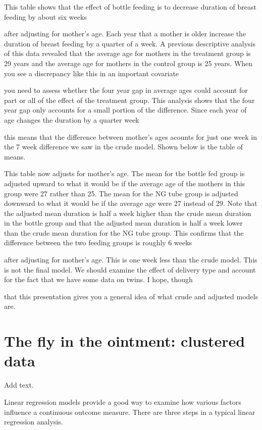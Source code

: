 \documentclass[
  letterpaper,
  DIV=11,
  numbers=noendperiod]{scrreprt}
\begin{document}
This table shows that the effect of bottle feeding is to decrease
duration of breast feeding by about six weeks

after adjusting for mother's age. Each year that a mother is older
increase the duration of breast feeding by a quarter of a week. A
previous descriptive analysis of this data revealed that the average age
for mothers in the treatment group is 29 years and the average age for
mothers in the control group is 25 years. When you see a discrepancy
like this in an important covariate

you need to assess whether the four year gap in average ages could
account for part or all of the effect of the treatment group. This
analysis shows that the four year gap only accounts for a small portion
of the difference. Since each year of age changes the duration by a
quarter week

this means that the difference between mother's ages acounts for just
one week in the 7 week difference we saw in the crude model. Shown below
is the table of means.

This table now adjusts for mother's age. The mean for the bottle fed
group is adjusted upward to what it would be if the average age of the
mothers in this group were 27 rather than 25. The mean for the NG tube
group is adjusted downward to what it would be if the average age were
27 instead of 29. Note that the adjusted mean duration is half a week
higher than the crude mean duration in the bottle group and that the
adjusted mean duration is half a week lower than the crude mean duration
for the NG tube group. This confirms that the difference between the two
feeding groups is roughly 6 weeks

after adjusting for mother's age. This is one week less than the crude
model. This is not the final model. We should examine the effect of
delivery type and account for the fact that we have some data on twins.
I hope, though

that this presentation gives you a general idea of what crude and
adjusted models are.

\section{The fly in the ointment: clustered
data}\label{the-fly-in-the-ointment-clustered-data}

Add text.

Linear regression models provide a good way to examine how various
factors influence a continuous outcome measure. There are three steps in
a typical linear regression analysis.
\end{document}
